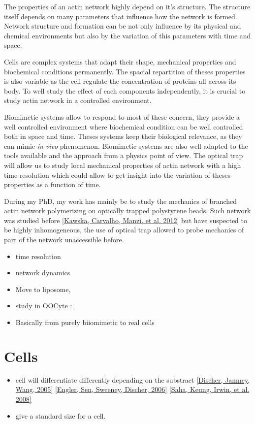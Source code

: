 \documentclass[A4paperpaper,11pt,english]{sphinxmanual}
\begin{document}
The properties of an actin network highly depend on it's structure. The
structure itself depends on many parameters that influence how the network is
formed. Network structure and formation can be not only influence by its
physical and chemical environments but also by the variation of this
parameters with time and space.

Cells are complex systems that adapt their shape, mechanical properties and
biochemical conditions permanently. The spacial repartition of theses
properties is also variable as the cell regulate the concentration of proteins
all across its body. To well study the effect of each components independently,
it is crucial to study actin network in a controlled environment.

Biomimetic systems allow to respond to most of these concern, they provide a
well controlled environment where biochemical condition can be well controlled
both in space and time. Theses systems keep their biological relevance, as they
can mimic \emph{in vivo} phenomenon. Biomimetic systems are also well adapted to the
tools available and the approach from a physics point of view. The optical trap
will allow us to study local mechanical properties of actin  network  with a
high time resolution which could allow to get insight into the variation of
theses properties as a function of time.

During my PhD, my work has mainly be to study the mechanics of branched actin
network polymerizing on optically trapped polystyrene beads. Such network was
studied before {\hyperref[bibitem:kawska2012]{{[}Kawska, Carvalho, Manzi,  et al.  2012{]}}}  but have suspected to be highly inhomogeneous,
the use of optical trap allowed to probe mechanics of part of the network
unaccessible before.
\begin{itemize}
\item {} 
time resolution

\item {} 
network dynamics

\item {} 
Move to liposome,

\item {} 
study in OOCyte :

\item {} 
Basically from purely biiomimetic to real cells

\end{itemize}


\section{Cells}
\label{parts/part1:cells}\begin{itemize}
\item {} 
cell will differentiate differently depending on the substract  {\hyperref[bibitem:discher2005]{{[}Discher, Janmey, Wang,  2005{]}}} {\hyperref[bibitem:engler2006]{{[}Engler, Sen, Sweeney, Discher,  2006{]}}} {\hyperref[bibitem:saha2008]{{[}Saha, Keung, Irwin,  et al.  2008{]}}}

\item {} 
give a standard size for a cell.

\end{itemize}
\end{document}
